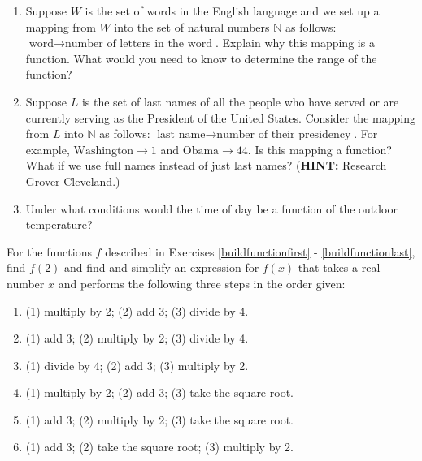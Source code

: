 \begin{enumerate}

\setcounter{enumi}{\value{HW}}

\item    Suppose $W$ is the set of words in the English language and we set up a mapping from $W$ into the set of natural numbers $\mathbb{N}$ as follows: $\text{word} \rightarrow \text{number of letters in the word}$.  Explain why this mapping is a function.  What would you need to know to determine the range of the function?

\item  Suppose $L$ is the set of last names of all the people who have served or are currently serving as the President of the United States.   Consider the mapping from $L$ into $\mathbb{N}$ as follows:  $\text{last name} \rightarrow \text{number of their presidency}$.  For example,  $\text{Washington} \rightarrow 1$ and $\text{Obama} \rightarrow 44$.  Is this mapping a function?  What if we use full names instead of just last names? (\textbf{HINT:}  Research Grover Cleveland.)

\item  Under what conditions would the time of day be a function of the outdoor temperature?

\setcounter{HW}{\value{enumi}}

\end{enumerate}


For the functions $f$ described in Exercises \ref{buildfunctionfirst} - \ref{buildfunctionlast}, find $f(2)$ and find and simplify an expression for $f(x)$ that takes a real number $x$ and performs the following three steps in the order given: 


\begin{enumerate}
\setcounter{enumi}{\value{HW}}

\item  (1) multiply by 2; (2) add 3; (3) divide by 4. \label{buildfunctionfirst}

\item  (1) add 3; (2) multiply by 2; (3) divide by 4. 

\item (1) divide by 4; (2) add 3; (3) multiply by 2.

\item (1) multiply by 2; (2) add 3; (3) take the square root.

\item  (1) add 3; (2) multiply by 2; (3) take the square root.

\item  (1) add 3; (2) take the square root; (3) multiply by 2.  \label{buildfunctionlast}

\setcounter{HW}{\value{enumi}}
\end{enumerate}


